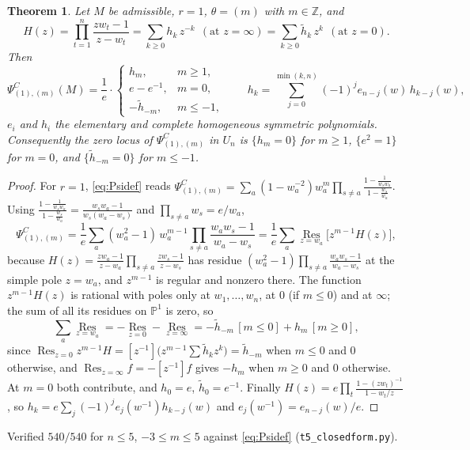 \documentclass[11pt]{article}
\newtheorem{theorem}{Theorem}
\theoremstyle{definition}
\theoremstyle{remark}
\newcommand{\PsiC}{\Psi^{C}}
\begin{document}
\begin{theorem}\label{thm:r1}
Let $M$ be admissible, $r=1$, $\theta=(m)$ with $m\in\mathbb{Z}$, and
\[
  H(z)=\prod_{t=1}^{n}\frac{zw_t-1}{z-w_t}
      =\sum_{k\ge0}h_k\,z^{-k}\ \ (\text{at }z=\infty)
      =\sum_{k\ge0}\tilde h_k\,z^{k}\ \ (\text{at }z=0).
\]
Then
\[
  \PsiC_{(1),(m)}(M)=\frac{1}{e}\cdot
  \begin{cases}
    h_m, & m\ge1,\\
    e-e^{-1}, & m=0,\\
    -\tilde h_{-m}, & m\le-1,
  \end{cases}
  \qquad
  h_k=\sum_{j=0}^{\min(k,n)}(-1)^j e_{n-j}(w)\,h_{k-j}(w),
\]
$e_i$ and $h_i$ the elementary and complete homogeneous symmetric polynomials.
Consequently the zero locus of $\PsiC_{(1),(m)}$ in $U_n$ is
$\{h_m=0\}$ for $m\ge1$, $\{e^2=1\}$ for $m=0$, and
$\{\tilde h_{-m}=0\}$ for $m\le-1$.
\end{theorem}

\begin{proof}
For $r=1$, \eqref{eq:Psidef} reads
$\PsiC_{(1),(m)}=\sum_{a}(1-w_a^{-2})w_a^{m}
 \prod_{s\ne a}\frac{1-\frac{1}{w_sw_a}}{1-\frac{w_s}{w_a}}$. Using
$\frac{1-\frac{1}{w_sw_a}}{1-\frac{w_s}{w_a}}
 =\frac{w_sw_a-1}{w_s(w_a-w_s)}$ and $\prod_{s\ne a}w_s=e/w_a$,
\[
  \PsiC_{(1),(m)}=\frac1e\sum_{a}(w_a^2-1)\,w_a^{m-1}
     \prod_{s\ne a}\frac{w_aw_s-1}{w_a-w_s}
  =\frac1e\sum_a \operatorname*{Res}_{z=w_a}\bigl[z^{m-1}H(z)\bigr],
\]
because $H(z)=\frac{zw_a-1}{z-w_a}\prod_{s\ne a}\frac{zw_s-1}{z-w_s}$ has
residue $(w_a^2-1)\prod_{s\ne a}\frac{w_aw_s-1}{w_a-w_s}$ at the simple pole
$z=w_a$, and $z^{m-1}$ is regular and nonzero there. The function
$z^{m-1}H(z)$ is rational with poles only at $w_1,\dots,w_n$, at $0$ (if $m\le0$)
and at $\infty$; the sum of all its residues on $\mathbb{P}^1$ is zero, so
\[
  \sum_a\operatorname*{Res}_{z=w_a}
  = -\operatorname*{Res}_{z=0}-\operatorname*{Res}_{z=\infty}
  = -\tilde h_{-m}\,[m\le0] + h_m\,[m\ge0],
\]
since $\operatorname{Res}_{z=0}z^{m-1}H=[z^{-1}]\bigl(z^{m-1}\sum\tilde h_kz^k\bigr)
=\tilde h_{-m}$ when $m\le0$ and $0$ otherwise, and
$\operatorname{Res}_{z=\infty}f=-[z^{-1}]f$ gives $-h_m$ when $m\ge0$ and $0$
otherwise. At $m=0$ both contribute, and $h_0=e$, $\tilde h_0=e^{-1}$.
Finally $H(z)=e\prod_t\frac{1-(zw_t)^{-1}}{1-w_t/z}$, so
$h_k=e\sum_j(-1)^je_j(w^{-1})h_{k-j}(w)$ and $e_j(w^{-1})=e_{n-j}(w)/e$.
\end{proof}

Verified $540/540$ for $n\le5$, $-3\le m\le5$ against \eqref{eq:Psidef}
(\texttt{t5\_closedform.py}).
\end{document}
